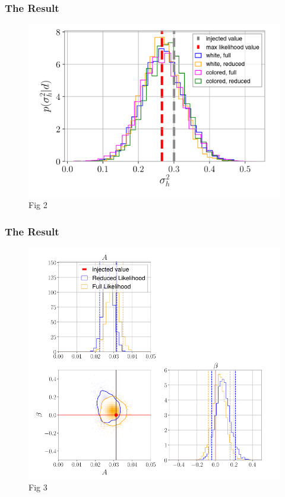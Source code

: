 \documentclass[10pt]{beamer}
\begin{document}
\begin{frame}
  \frametitle{The Result}
  \begin{figure}
    \centering

    \includegraphics[scale=.5]{fig2p.png}
    \caption{Fig 2}
  \end{figure}
\end{frame}

\begin{frame}
  \frametitle{The Result}
  \begin{figure}
    \centering
    \includegraphics[scale=.29]{fig3p.png}
    \caption{Fig 3}
  \end{figure}
\end{frame}
\end{document}
